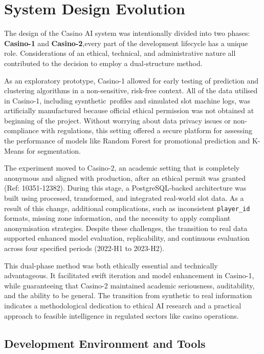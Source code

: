 \documentclass[12pt,a4paper]{report}
\begin{document}
\section{System Design Evolution}
\label{sec:system_design_evolution}

The design of the Casino AI system was intentionally divided into two phases: \textbf{Casino-1} and \textbf{Casino-2},every part of the development lifecycle has a unique role.  Considerations of an ethical, technical, and administrative nature all contributed to the decision to employ a dual-structure method.

As an exploratory prototype, Casino-1 allowed for early testing of prediction and clustering algorithms in a non-sensitive, risk-free context.  All of the data utilised in Casino-1, including sysnthetic profiles and simulated slot machine logs, was artificially manufactured because official ethical permission was not obtained at beginning of the project.  Without worrying about data privacy issues or non-compliance with regulations, this setting offered a secure platform for assessing the performance of models like Random Forest for promotional prediction and K-Means for segmentation.

The experiment moved to Casino-2, an academic setting that is completely anonymous and aligned with production, after an ethical permit was granted (Ref: 10351-12382). During this stage, a PostgreSQL-backed architecture was built using processed, transformed, and integrated real-world slot data. As a result of this change, additional complications, such as inconsistent \texttt{player\_id} formats, missing zone information, and the necessity to apply compliant anonymisation strategies. Despite these challenges, the transition to real data supported enhanced model evaluation, replicability, and continuous evaluation across four specified periods (2022-H1 to 2023-H2).

This dual-phase method was both ethically essential and technically advantageous.  It facilitated swift iteration and model enhancement in Casino-1, while guaranteeing that Casino-2 maintained academic seriousness, auditability, and the ability to be general. The transition from synthetic to real information indicates a methodological dedication to ethical AI research and a practical approach to feasible intelligence in regulated sectors like casino operations.


\subsection{Development Environment and Tools}
\end{document}
